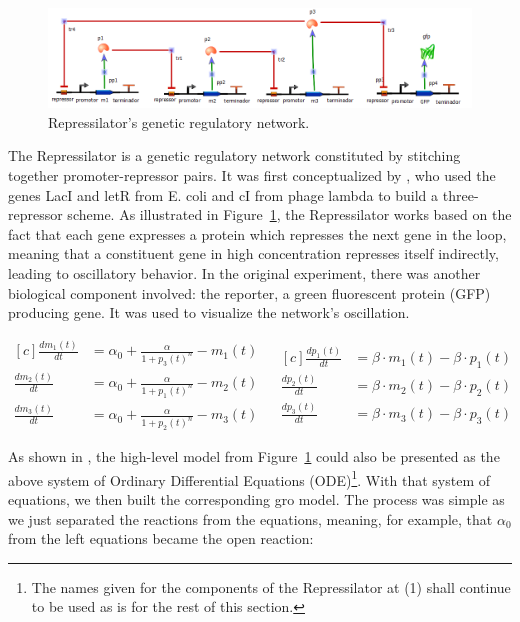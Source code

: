 \documentclass[12pt]{article}
\begin{document}
    \begin{figure}[h]
        \centering
        \includegraphics[scale = 0.7]{repressilator_model.png}
        \caption{Repressilator's genetic regulatory network.}
        \label{fig:repressilator_model}
    \end{figure}
    
    The Repressilator is a genetic regulatory network constituted by stitching together promoter-repressor pairs. It was first conceptualized by \cite{Elowitz2000}, who used the genes LacI and letR from E. coli and cI from phage lambda to build a three-repressor scheme. As illustrated in Figure~\ref{fig:repressilator_model}, the Repressilator works based on the fact that each gene expresses a protein which represses the next gene in the loop, meaning that a constituent gene in high concentration represses itself indirectly, leading to oscillatory behavior. In the original experiment, there was another biological component involved: the reporter, a green fluorescent protein (GFP) producing gene. It was used to visualize the network's oscillation.
    
    \begin{equation}
    \begin{aligned}[c]
        \frac{dm_{1}(t)}{dt} & = \alpha_{0} + \frac{\alpha}{1 + p_{3}(t)^{n}} - m_{1}(t) & \\
        \frac{dm_{2}(t)}{dt} & = \alpha_{0} + \frac{\alpha}{1 + p_{1}(t)^{n}} - m_{2}(t) & \\
        \frac{dm_{3}(t)}{dt} & = \alpha_{0} + \frac{\alpha}{1 + p_{2}(t)^{n}} - m_{3}(t) &
    \end{aligned}
    \begin{aligned}[c]
        \frac{dp_{1}(t)}{dt} & = \beta \cdot m_{1}(t) - \beta \cdot p_{1}(t) \\
        \frac{dp_{2}(t)}{dt} & = \beta \cdot m_{2}(t) - \beta \cdot p_{2}(t) \\
        \frac{dp_{3}(t)}{dt} & = \beta \cdot m_{3}(t) - \beta \cdot p_{3}(t)
    \end{aligned}
    \end{equation}

    As shown in \cite{Elowitz2000}, the high-level model from Figure~\ref{fig:repressilator_model} could also be presented as the above system of Ordinary Differential Equations (ODE)\footnote{The names given for the components of the Repressilator at (1) shall continue to be used as is for the rest of this section.}. With that system of equations, we then built the corresponding gro model. The process was simple as we just separated the reactions from the equations, meaning, for example, that $\alpha_{0}$ from the left equations became the open reaction:
    
\end{document}
